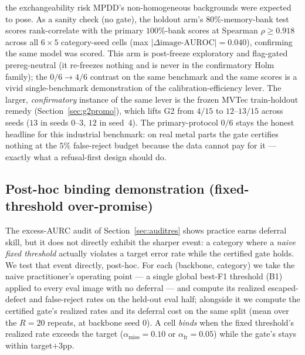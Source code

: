 \documentclass[preprint,11pt]{elsarticle}
\begin{document}
the exchangeability risk MPDD's non-homogeneous backgrounds were expected to pose. As a sanity
check (no gate), the holdout arm's $80\%$-memory-bank test scores rank-correlate with the primary
$100\%$-bank scores at Spearman $\rho\ge 0.918$ across all $6\times5$ category-seed cells (max
$|\Delta\text{image-AUROC}|=0.040$), confirming the same model was scored. This arm is post-freeze
exploratory and flag-gated prereg-neutral (it re-freezes nothing and is never in the confirmatory
Holm family); the $0/6 \to 4/6$ contrast on the same benchmark and the same scores is a vivid
single-benchmark demonstration of the calibration-efficiency lever. The larger, \emph{confirmatory}
instance of the same lever is the frozen MVTec train-holdout remedy (Section~\ref{sec:g2promo}),
which lifts G2 from $4/15$ to $12$--$13/15$ across seeds ($13$ in seeds $0$--$3$, $12$ in seed~$4$).
The primary-protocol $0/6$ stays the honest headline for this industrial benchmark: on real metal
parts the gate certifies nothing at the $5\%$ false-reject budget because the data cannot pay for
it --- exactly what a refusal-first design should do.

\subsection{Post-hoc binding demonstration (fixed-threshold over-promise)}
\label{sec:binding}

The excess-AURC audit of Section~\ref{sec:auditres} shows practice earns deferral skill, but it does not directly exhibit the
sharper event: a category where a \emph{naive fixed threshold} actually violates a target error
rate while the certified gate holds. We test that event directly, post-hoc. For each
(backbone, category) we take the naive practitioner's operating point --- a single global best-F1
threshold (B1) applied to every eval image with no deferral --- and compute its realized
escaped-defect and false-reject rates on the held-out eval half; alongside it we compute the
certified gate's realized rates and its deferral cost on the same split (mean over the $R=20$
repeats, at backbone seed $0$). A cell \emph{binds} when the fixed threshold's realized rate
exceeds the target ($\alpha_{\text{miss}}=0.10$ or $\alpha_{\text{fr}}=0.05$) while the gate's stays
within target$+3$pp.
\end{document}
